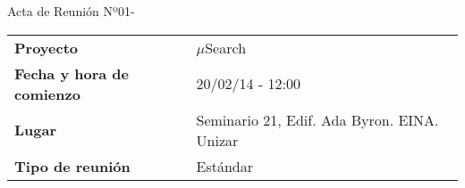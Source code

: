 \begin{center}	
\Large{Acta de Reunión Nº01\hspace{0.25em}-\hspace{0.25em}\tituloReunion}
\end{center}
\vspace{1.5em}

\begin{longtable}{ | L{\tabcolsep} |
				     L{\tabcolsep} | }
\hline %
  \\
\hline %
{\bf Proyecto} & $\mu$Search \\ 
\hline %
{\bf Fecha y hora de comienzo} & 20/02/14 - 12:00 \\
\hline %
{\bf Lugar} & Seminario 21, Edif. Ada Byron. EINA. Unizar \\
\hline %
{\bf Tipo de reunión} & Estándar \\
\hline %
\end{longtable}


